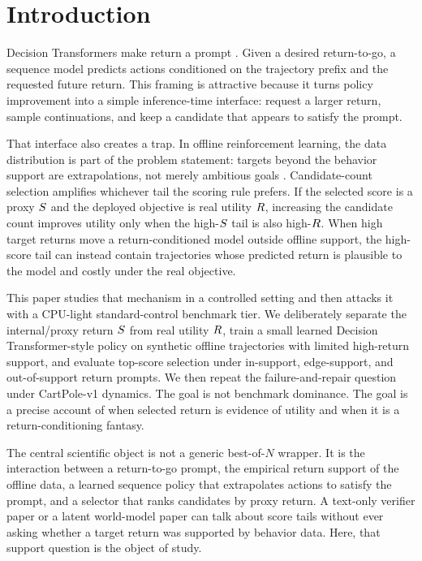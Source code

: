 \section{Introduction}

Decision Transformers make return a prompt \citep{chen2021decision}. Given a desired return-to-go, a sequence model predicts actions conditioned on the trajectory prefix and the requested future return. This framing is attractive because it turns policy improvement into a simple inference-time interface: request a larger return, sample continuations, and keep a candidate that appears to satisfy the prompt.

That interface also creates a trap. In offline reinforcement learning, the data distribution is part of the problem statement: targets beyond the behavior support are extrapolations, not merely ambitious goals \citep{levine2020offline,fu2021d4rl}. Candidate-count selection amplifies whichever tail the scoring rule prefers. If the selected score is a proxy $S$ and the deployed objective is real utility $R$, increasing the candidate count improves utility only when the high-$S$ tail is also high-$R$. When high target returns move a return-conditioned model outside offline support, the high-score tail can instead contain trajectories whose predicted return is plausible to the model and costly under the real objective.

This paper studies that mechanism in a controlled setting and then attacks it with a CPU-light standard-control benchmark tier. We deliberately separate the internal/proxy return $S$ from real utility $R$, train a small learned Decision Transformer-style policy on synthetic offline trajectories with limited high-return support, and evaluate top-score selection under in-support, edge-support, and out-of-support return prompts. We then repeat the failure-and-repair question under CartPole-v1 dynamics. The goal is not benchmark dominance. The goal is a precise account of when selected return is evidence of utility and when it is a return-conditioning fantasy.

The central scientific object is not a generic best-of-$N$ wrapper. It is the interaction between a return-to-go prompt, the empirical return support of the offline data, a learned sequence policy that extrapolates actions to satisfy the prompt, and a selector that ranks candidates by proxy return. A text-only verifier paper or a latent world-model paper can talk about score tails without ever asking whether a target return was supported by behavior data. Here, that support question is the object of study.

